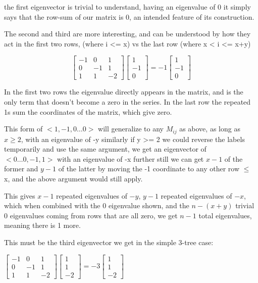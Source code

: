 \documentclass{report}
\begin{document}
the first eigenvector is trivial to understand, having an eigenvalue of 0 it
simply says that the row-sum of our matrix is 0, an intended feature of its
construction.

The second and third are more interesting, and can be understood by how they
act in the first two rows, (where i <= x) vs the last row (where x < i <= x+y)

\begin{equation*}
\left[\begin{matrix}
	-1 & 0 & 1\\
	0 & -1 & 1\\
	1 & 1 & -2
\end{matrix}\right]
\left[\begin{matrix}
	1\\
	-1\\
	0
\end{matrix}\right]
=
-1
\left[\begin{matrix}
	1\\
	-1\\
	0
\end{matrix}\right]
\end{equation*}

In the first two rows the eigenvalue directly appears in the matrix, and is the
only term that doesn't become a zero in the series.
In the last row the repeated 1s sum the coordinates of the matrix, which give
zero.

This form of $<1, -1, 0\ldots 0>$ will generalize to any $M_{ij}$ as above, as long as
$x \geq 2$, with an eigenvalue of -y
similarly if y >= 2 we could reverse the labels temporarily and use the same
argument, we get an eigenvector of $<0\ldots 0, -1, 1>$ with an eigenvalue of -x
further still we can get $x-1$ of the former and $y-1$ of the latter by moving the
-1 coordinate to any other row $\leq$ x, and the above argument would still apply.

This gives $x-1$ repeated eigenvalues of $-y$, $y-1$ repeated eigenvalues of $-x$,
which when combined with the 0 eigenvalue shown, and the $n - (x + y)$ trivial $0$
eigenvalues coming from rows that are all zero, we get $n-1$ total eigenvalues,
meaning there is 1 more.

This must be the third eigenvector we get in the simple 3-tree case:

$
\left[\begin{matrix}
	-1 & 0 & 1\\
	0 & -1 & 1\\
	1 & 1 & -2
\end{matrix}\right]
\left[\begin{matrix}
	1\\
	1\\
	-2
\end{matrix}\right]
=
-3
\left[\begin{matrix}
	1\\
	1\\
	-2
\end{matrix}\right]
$
\end{document}
